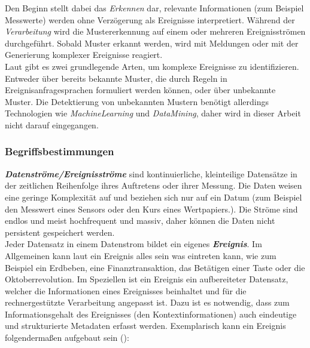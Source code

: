 \documentclass{acm_proc_article-sp}
\begin{document}
Den Beginn stellt dabei das \emph{Erkennen} dar, relevante Informationen (zum Beispiel 
Messwerte) werden ohne Verzögerung als Ereignisse interpretiert. Während der 
\emph{Verarbeitung} wird die Mustererkennung auf einem oder mehreren Ereignisströmen 
durchgeführt. Sobald Muster erkannt werden, wird mit Meldungen oder mit 
der Generierung komplexer Ereignisse reagiert.\\
Laut \cite{eckert} gibt es zwei grundlegende Arten, um 
komplexe Ereignisse zu identifizieren. Entweder über bereits bekannte Muster, die durch 
Regeln in Ereignisanfragesprachen formuliert werden können, oder über unbekannte Muster. 
Die Detektierung von unbekannten Mustern benötigt allerdings Technologien wie 
\textit{MachineLearning} und \textit{DataMining}, daher wird in dieser Arbeit nicht 
darauf eingegangen.

\subsubsection{Begriffsbestimmungen}\label{begriffsbestimmung}
\vspace{0.1cm}
\textbf{\textit{Datenströme/Ereignisströme}}
sind kontinuierliche, kleinteilige Datensätze in der 
zeitlichen Reihenfolge ihres Auftretens oder ihrer Messung. Die Daten weisen eine geringe 
Komplexität auf und beziehen sich nur auf ein Datum (zum Beispiel den Messwert eines 
Sensors oder den Kurs eines Wertpapiers.). Die Ströme sind endlos und meist 
hochfrequent und massiv, daher können die Daten nicht persistent gespeichert werden.\\
Jeder Datensatz in einem Datenstrom bildet ein eigenes 
\textbf{\textit{Ereignis}}. Im 
Allgemeinen kann laut \cite{glossary} ein Ereignis alles sein was eintreten kann, wie zum 
Beispiel ein Erdbeben, eine Finanztransaktion, das Betätigen einer Taste oder die 
Oktoberrevolution. Im Speziellen ist ein Ereignis ein aufbereiteter Datensatz, welcher 
die Informationen eines Ereignisses beinhaltet und für die rechnergestützte Verarbeitung 
angepasst ist. Dazu ist es notwendig, dass zum Informationsgehalt des Ereignisses (den 
Kontextinformationen) auch eindeutige und strukturierte Metadaten erfasst werden. 
Exemplarisch 
kann ein Ereignis folgendermaßen aufgebaut sein (\cite{hedtstuck}):
\end{document}
